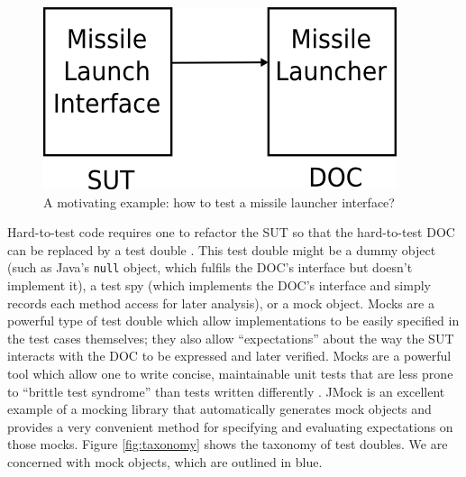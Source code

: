 \documentclass[proposal]{softeng}
\begin{document}
\begin{figure}
  \centering
  \includegraphics[scale=.45]{img/missile_launch1.png}
  \caption{A motivating example: how to test a missile launcher
    interface?}
  \label{fig:missile_orig}
\end{figure}

Hard-to-test code requires one to refactor the SUT so that the
hard-to-test DOC can be replaced by a test double
\cite{meszaros:xunit}. This test double might be a dummy object (such
as Java's \verb|null| object, which fulfils the DOC's interface but
doesn't implement it), a test spy (which implements the DOC's
interface and simply records each method access for later analysis),
or a mock object. Mocks are a powerful type of test double which allow
implementations to be easily specified in the test cases themselves;
they also allow ``expectations'' about the way the SUT interacts with
the DOC to be expressed and later verified. Mocks are a powerful tool
which allow one to write concise, maintainable unit tests that are
less prone to ``brittle test syndrome'' than tests written differently
\cite{meszaros:xunit}. JMock \cite{www:jmock} is an excellent example
of a mocking library that automatically generates mock objects and
provides a very convenient method for specifying and evaluating
expectations on those mocks. Figure \ref{fig:taxonomy} shows the
taxonomy of test doubles. We are concerned with mock objects, which
are outlined in blue.

\end{document}
